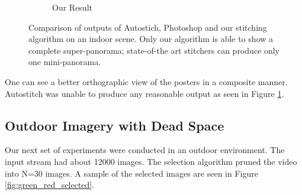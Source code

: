 \begin{figure}
\begin{subfigure}[b]{\textwidth}
\caption{Our Result}
\end{subfigure}
\caption{Comparison of outputs of Autostich, Photoshop and our stitching
algorithm on an indoor scene. Only our
algorithm is able to show a complete super-panorama; state-of-the art
stitchers can produce only one mini-panorama.}
\label{fig:idc_indoor_comparison}
\end{figure}

One can see a better orthographic view of the posters in a composite
manner. Autostitch was unable to produce any reasonable output as seen in
Figure \ref{fig:idc_indoor_comparison}.

\subsection{Outdoor Imagery with Dead Space}
Our next set of experiments were conducted in an outdoor environment. The  
input stream had about 12000 images. The selection algorithm pruned the video
into N=30 images. A sample of the selected images are seen in Figure
\ref{fig:green_red_selected}.

